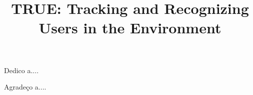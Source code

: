 \documentclass[bacharelado]{unb-cic}
\title{TRUE: Tracking and Recognizing Users in the Environment}
\begin{document}
\maketitle
\pretextual
\begin{dedicatoria}
	Dedico a....
\end{dedicatoria}

\begin{agradecimentos}
	Agradeço a....
\end{agradecimentos}







\tableofcontents
\listoffigures
\listoftables

\textual





% 




\postextual




\end{document}
